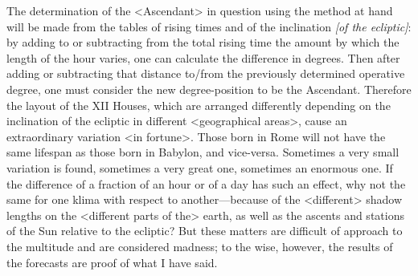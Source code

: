 The determination of the <Ascendant> in question using the method at hand will be made from the tables of rising times and of the inclination \textit{[of the ecliptic]}: by adding to or subtracting from the total rising time the amount by which the length of the hour varies, one can calculate the difference in degrees. Then after adding or subtracting that distance to/from the previously determined operative degree, one must consider the new degree-position to be the Ascendant. Therefore the layout of the XII Houses, which are arranged differently depending on the inclination of the ecliptic in different <geographical areas>, cause an extraordinary variation <in fortune>. Those born in Rome will not have the same lifespan as those born in Babylon, and vice-versa. Sometimes a very small variation is found, sometimes a very great one, sometimes an
enormous one. If the difference of a fraction of an hour or of a day has such an effect, why not the same for one klima with respect to another—because of the <different> shadow lengths on the <different parts of the> earth, as well as the ascents and stations of the Sun relative to the ecliptic? But these matters are difficult of
approach to the multitude and are considered madness; to the wise, however, the results of the forecasts are proof of what I have said.

